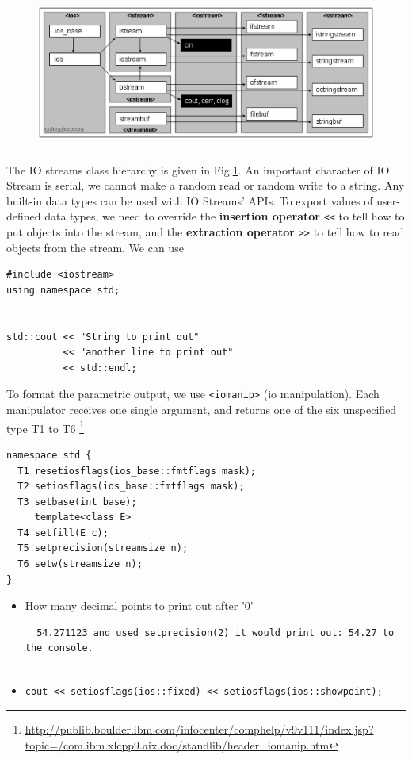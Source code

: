 \begin{figure}[hbt]
  \centerline{\includegraphics[height=5cm,
    angle=0]{./images/ios_hierarchy.eps}}
  \caption{}
  \label{fig:ios_hierarchy}
\end{figure}

The IO streams class hierarchy is given in Fig.\ref{fig:ios_hierarchy}.  An
important character of IO Stream is serial, we cannot make a random read or
random write to a string. Any built-in data types can be used with IO Streams'
APIs. To export values of user-defined data types, we need to override the {\bf
insertion operator} \verb!<<! to tell how to put objects into the stream, and
the {\bf extraction operator} \verb!>>! to tell how to read objects from the
stream. We can use 
\begin{verbatim}
#include <iostream>
using namespace std;


std::cout << "String to print out"
          << "another line to print out" 
          << std::endl;
\end{verbatim}


To format the parametric output, we use \verb!<iomanip>! (io manipulation). Each
manipulator receives one single argument, and returns one of the six unspecified
type T1 to T6
\footnote{\url{http://publib.boulder.ibm.com/infocenter/comphelp/v9v111/index.jsp?topic=/com.ibm.xlcpp9.aix.doc/standlib/header_iomanip.htm}}
\begin{verbatim}
namespace std {
  T1 resetiosflags(ios_base::fmtflags mask);
  T2 setiosflags(ios_base::fmtflags mask);
  T3 setbase(int base);
     template<class E>
  T4 setfill(E c);
  T5 setprecision(streamsize n);
  T6 setw(streamsize n);
}
\end{verbatim}
\begin{itemize}
  \item How many decimal points to print out after '0'
  \begin{verbatim}
  54.271123 and used setprecision(2) it would print out: 54.27 to the console.
  
  \end{verbatim}
  
  \item
  \begin{verbatim}
cout << setiosflags(ios::fixed) << setiosflags(ios::showpoint);  
  \end{verbatim}
\end{itemize}

